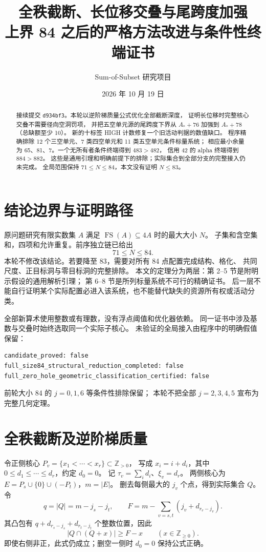 \documentclass[11pt,a4paper]{article}
\title{全秩截断、长位移交叠与尾跨度加强\\\large 上界 84 之后的严格方法改进与条件性终端证书}
\author{Sum-of-Subset 研究项目}
\date{2026 年 10 月 19 日}
\newcommand{\Z}{\mathbb Z}
\newcommand{\A}{A_*}
\begin{document}
\maketitle
\begin{abstract}
接续提交 \texttt{d934bf3}。本轮以逆阶梯质量公式优化全部截断深度，
证明长位移时完整核心交叠不需要径向空洞罚项，
并把五空单元源的尾跨度下界从 $\A+76$ 加强到 $\A+78$（总缺额至少 10）。
新的十标签 HIGH 计数修复一个旧活动判据的数值缺口。
程序精确排除 12 个三空单元、7 类四空单元和 11 类五空单元条件标量系统；
相应最小余量为 65、81、7。一个无所有者条件终端得到 $483>482$，
信用 42 的 alpha 终端得到 $884>882$。
这些是通用引理和明确前提下的排除；实际集合到全部分支的完整接入仍未完成。
全局范围保持 $71\le N\le84$，本文没有证明 $N\le83$。
\end{abstract}

\section{结论边界与证明路径}
原问题研究有限实数集 $A$ 满足 $\operatorname{FS}(A)\subseteq4A$ 时的最大大小 $N$。
子集和含空集和，四项和允许重复。前序独立链已给出
\[\boxed{71\le N\le84.}\]
本轮不修改该结论。若要降至 83，需要对所有 84 点配置完成结构、格化、
共同尺度、正目标洞与零目标洞的完整排除。
本文的定理分为两层：第 2--5 节是附明示假设的通用解析引理；
第 6--8 节是所列标量系统不可行的精确证书。
后一层不能自行证明某个实际配置必进入该系统，也不能替代缺失的资源所有权或活动分类。

全部新算术使用整数或有理数，没有浮点阈值和优化器依赖。
同一证书中涉及基数与交叠时始终选取同一个实际子核心。
未验证的全局接入由程序中的明确假值保留：
\begin{verbatim}
candidate_proved: false
full_size84_structural_reduction_completed: false
full_zero_hole_geometric_classification_certified: false
\end{verbatim}
前轮大小 84 的 $j=0,1,6$ 等条件性排除保留；
本轮不把全部 $j=2,3,4,5$ 宣布为完整几何定理。

\section{全秩截断及逆阶梯质量}
令正侧核心 $P_v=\{x_1<\cdots<x_r\}\subset\Z_{>0}$，
写成 $x_i=i+d_i$，其中 $0\le d_1\le\cdots\le d_r$，约定 $d_0=0$。
记 $\tau_v=\sum_i d_i$、$\xi_v=d_r$。
两侧核心为 $E=P_s\cup\{0\}\cup(-P_t)$，$m=|E|$。
删去每侧最大的 $j_v$ 个点，得到实际集合 $Q$。令
\[
q=|Q|=m-j_s-j_t,\qquad
F=m-\sum_{v=s,t}(j_v+d_{r_v-j_v}).
\]
其凸包有 $q+d_{r_s-j_s}+d_{r_t-j_t}$ 个整数位置，因此
\begin{equation}\label{eq:intersection}
|Q\cap(Q+x)|\ge F-x\qquad(x\in\Z_{\ge0}).
\end{equation}
即使右侧非正，此式仍成立；删空一侧时 $d_0=0$ 保持公式正确。
\end{document}
